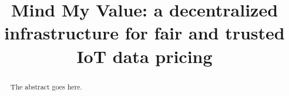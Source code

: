 \documentclass[chi_draft]{sigchi}
\begin{document}
%
\title{Mind My Value: a decentralized infrastructure for fair and trusted IoT data pricing}



\emptyauthor


\maketitle

\begin{abstract}
The abstract goes here.
\end{abstract}
\end{document}
